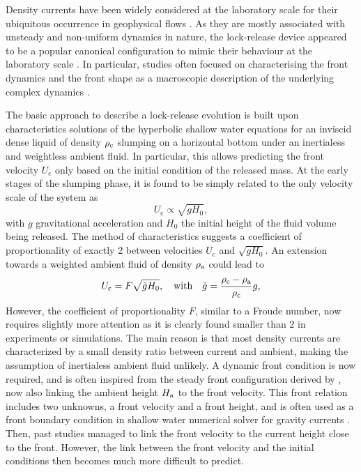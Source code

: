 \documentclass[12pt]{article}
\begin{document}
Density currents have been widely considered at the laboratory scale for their ubiquitous occurrence in geophysical flows \citep{Hopfinger1983,Simpson1999,Dufek2016}. As they are mostly associated with unsteady and non-uniform dynamics in nature, the lock-release device appeared to be a popular canonical configuration to mimic their behaviour at the laboratory scale \citep{Hacker1996,Shin2004,Nogueira2014}. In particular, studies often focused on characterising the front dynamics and the front shape as a macroscopic description of the underlying complex dynamics \citep{Rottman1983,Marino2005,Hogg2006}.

The basic approach to describe a lock-release evolution is built upon characteristics solutions of the hyperbolic shallow water equations for an inviscid dense liquid of density $\rho_{\text c}$ slumping on a horizontal bottom under an inertialess and weightless ambient fluid. In particular, this allows predicting the front velocity $U_{\text{c}}$ only based on the initial condition of the released mass. At the early stages of the slumping phase, it is found to be simply related to the only velocity scale of the system as
\begin{equation}
	U_{\text{c}}\propto \sqrt{gH_0},
\end{equation}
with $g$ gravitational acceleration and $H_0$ the initial height of the fluid volume being released. The method of characteristics suggests a coefficient of proportionality of exactly $2$ between velocities $U_{\text{c}}$ and $\sqrt{g H_0}$. An extension towards a weighted ambient fluid of density $\rho_{\text a}$ could lead to
\begin{equation}
	\label{eq:solUc}
	U_{\text{c}}=F\sqrt{\tilde{g}H_0},\quad\mbox{with}\quad \tilde{g}=\frac{\rho_{\text c}-\rho_{\text a}}{\rho_{\text c}}g,
\end{equation}
However, the coefficient of proportionality $F$, similar to a Froude number, now requires slightly more attention as it is clearly found smaller than $2$ in experiments or simulations. The main reason is that most density currents are characterized by a small density ratio between current and ambient, making the assumption of inertialess ambient fluid unlikely. A dynamic front condition is now required, and is often inspired from the steady front configuration derived by \citet{Benjamin1968}, now also linking the ambient height $H_{\text a}$ to the front velocity. This front relation includes two unknowns, a front velocity and a front height, and is often used as a front boundary condition in shallow water numerical solver for gravity currents \cite[e.g.][]{Ungarish2009}. Then, past studies managed to link the front velocity to the current height close to the front. However, the link between the front velocity and the initial conditions then becomes much more difficult to predict.
\end{document}
